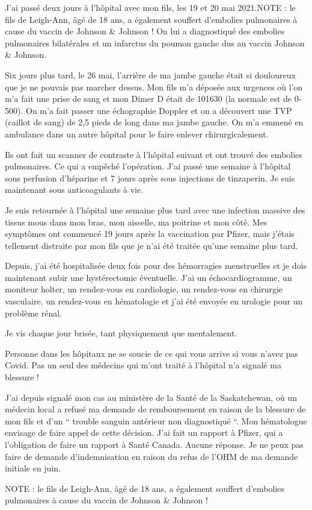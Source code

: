 J'ai passé deux jours à l'hôpital avec mon fils, les 19 et 20 mai 2021.NOTE : le
fils de Leigh-Ann, âgé de 18 ans, a également souffert d'embolies pulmonaires à
cause du vaccin de Johnson \& Johnson ! On lui a diagnostiqué des embolies
pulmonaires bilatérales et un infarctus du poumon gauche dus au vaccin Johnson \&
Johnson.

Six jours plus tard, le 26 mai, l'arrière de ma jambe gauche était si douloureux
que je ne pouvais pas marcher dessus. Mon fils m'a déposée aux urgences où l'on
m'a fait une prise de sang et mon Dimer D était de 101630 (la normale est de
0-500). On m'a fait passer une échographie Doppler et on a découvert une TVP
(caillot de sang) de 2,5 pieds de long dans ma jambe gauche. On m'a emmené en
ambulance dans un autre hôpital pour le faire enlever chirurgicalement.

Ils ont fait un scanner de contraste à l'hôpital suivant et ont trouvé des
embolies pulmonaires. Ce qui a empêché l'opération. J'ai passé une semaine à
l'hôpital sous perfusion d'héparine et 7 jours après sous injections de
tinzaperin. Je suis maintenant sous anticoagulants à vie.

Je suis retournée à l'hôpital une semaine plus tard avec une infection massive
des tissus mous dans mon bras, mon aisselle, ma poitrine et mon côté. Mes
symptômes ont commencé 19 jours après la vaccination par Pfizer, mais j'étais
tellement distraite par mon fils que je n'ai été traitée qu'une semaine plus
tard.

Depuis, j'ai été hospitalisée deux fois pour des hémorragies menstruelles et je
dois maintenant subir une hystérectomie éventuelle. J'ai un échocardiogramme, un
moniteur holter, un rendez-vous en cardiologie, un rendez-vous en chirurgie
vasculaire, un rendez-vous en hématologie et j'ai été envoyée en urologie pour
un problème rénal.

Je vis chaque jour brisée, tant physiquement que mentalement.

Personne dans les hôpitaux ne se soucie de ce qui vous arrive si vous n'avez pas
Covid. Pas un seul des médecins qui m'ont traité à l'hôpital n'a signalé ma
blessure !

J'ai depuis signalé mon cas au ministère de la Santé de la Saskatchewan, où un
médecin local a refusé ma demande de remboursement en raison de la blessure de
mon fils et d'un `` trouble sanguin antérieur non diagnostiqué ``. Mon
hématologue envisage de faire appel de cette décision. J'ai fait un rapport à
Pfizer, qui a l'obligation de faire un rapport à Santé Canada. Aucune
réponse. Je ne peux pas faire de demande d'indemnisation en raison du refus de
l'OHM de ma demande initiale en juin.

NOTE : le fils de Leigh-Ann, âgé de 18 ans, a également souffert d'embolies
pulmonaires à cause du vaccin de Johnson \& Johnson !
